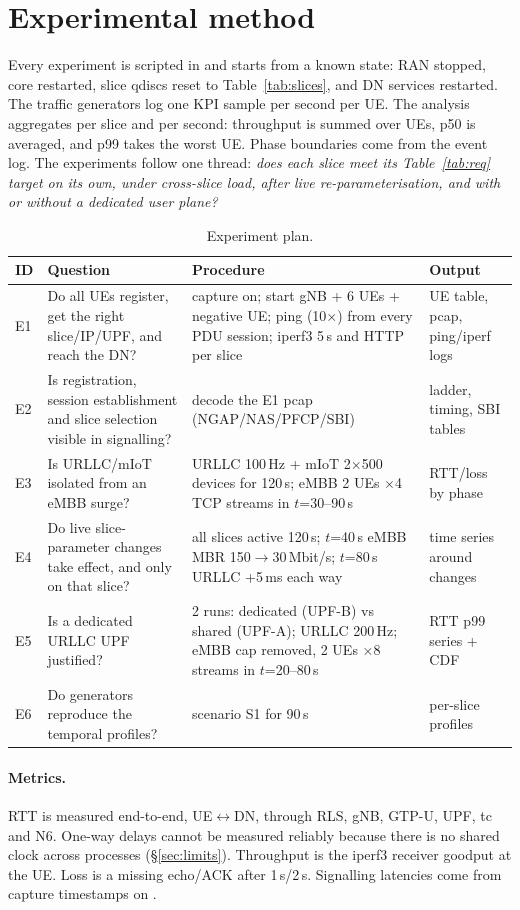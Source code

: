 \section{Experimental method}\label{sec:method}
Every experiment is scripted in  and starts from a known state:
RAN stopped, core restarted, slice qdiscs reset to Table~\ref{tab:slices}, and DN services
restarted. The traffic generators log one KPI sample per second per UE. The analysis
aggregates per slice and per second: throughput is summed over UEs, p50 is averaged, and p99
takes the worst UE. Phase boundaries come from the event log. The experiments follow one
thread: \emph{does each slice meet its Table~\ref{tab:req} target on its own, under
cross-slice load, after live re-parameterisation, and with or without a dedicated user plane?}

\begin{table}[!htbp]\centering\small
\caption{Experiment plan.}\label{tab:exp}
\begin{tabularx}{\linewidth}{l>{\raggedright}p{3.4cm}>{\raggedright}X>{\raggedright\arraybackslash}p{3.1cm}}
\toprule
ID & Question & Procedure & Output\\
\midrule
E1 & Do all UEs register, get the right slice/IP/UPF, and reach the DN? & capture on; start gNB + 6 UEs + negative UE; ping (10$\times$) from every PDU session; iperf3 5\,s and HTTP per slice & UE table, pcap, ping/iperf logs\\
E2 & Is registration, session establishment and slice selection visible in signalling? & decode the E1 pcap (NGAP/NAS/PFCP/SBI) & ladder, timing, SBI tables\\
E3 & Is URLLC/mIoT isolated from an eMBB surge? & URLLC 100\,Hz + mIoT 2$\times$500 devices for 120\,s; eMBB 2 UEs $\times$4 TCP streams in $t$=30--90\,s & RTT/loss by phase\\
E4 & Do live slice-parameter changes take effect, and only on that slice? & all slices active 120\,s; $t$=40\,s eMBB MBR 150$\rightarrow$30\,Mbit/s; $t$=80\,s URLLC +5\,ms each way & time series around changes\\
E5 & Is a dedicated URLLC UPF justified? & 2 runs: dedicated (UPF-B) vs shared (UPF-A); URLLC 200\,Hz; eMBB cap removed, 2 UEs $\times$8 streams in $t$=20--80\,s & RTT p99 series + CDF\\
E6 & Do generators reproduce the temporal profiles? & scenario S1 for 90\,s & per-slice profiles\\
\bottomrule
\end{tabularx}
\end{table}

\paragraph{Metrics.} RTT is measured end-to-end, UE$\leftrightarrow$DN, through RLS, gNB,
GTP-U, UPF, tc and N6. One-way delays cannot be measured reliably because there is no shared
clock across processes (\S\ref{sec:limits}). Throughput is the iperf3 receiver goodput at the
UE. Loss is a missing echo/ACK after 1\,s/2\,s. Signalling latencies come from capture
timestamps on .
